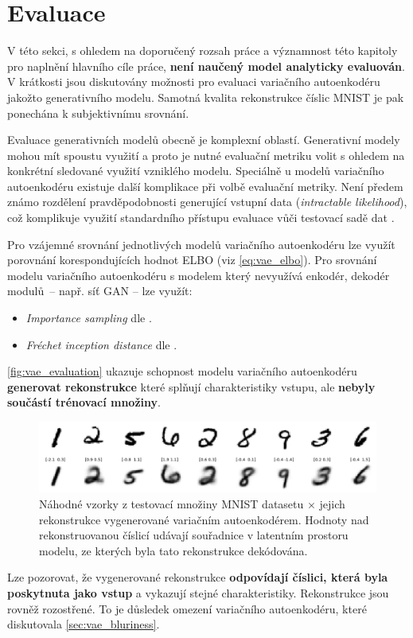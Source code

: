 \section{Evaluace}
V této sekci, s ohledem na doporučený rozsah práce a významnost této kapitoly pro naplnění hlavního cíle práce, \textbf{není naučený model analyticky evaluován}.
V krátkosti jsou diskutovány možnosti pro evaluaci variačního autoenkodéru jakožto generativního modelu.
Samotná kvalita rekonstrukce číslic MNIST je pak ponechána k subjektivnímu srovnání.

Evaluace generativních modelů obecně je komplexní oblastí.
Generativní modely mohou mít spoustu využití a proto je nutné evaluační metriku volit s ohledem na konkrétní sledované využití vzniklého modelu.
Speciálně u modelů variačního autoenkodéru existuje další komplikace při volbě evaluační metriky. Není předem známo rozdělení pravděpodobnosti generující vstupní data (\emph{intractable likelihood}), což komplikuje využití standardního přístupu evaluace vůči testovací sadě dat \cite{Goodfellow2016}.

Pro vzájemné srovnání jednotlivých modelů variačního autoenkodéru lze využít porovnání korespondujících hodnot ELBO (viz \autoref{eq:vae_elbo}).
Pro srovnání modelu variačního autoenkodéru s modelem který nevyužívá enkodér, dekodér modulů – např. síť GAN \cite{Goodfellow2014} – lze využít:

\begin{itemize}
    \item \emph{Importance sampling} dle \textcite{Bartler2019}.
    \item \emph{Fréchet inception distance} dle \textcite{Asperti2020}.
\end{itemize}

\autoref{fig:vae_evaluation} ukazuje schopnost modelu variačního autoenkodéru \textbf{generovat rekonstrukce} které splňují charakteristiky vstupu, ale \textbf{nebyly součástí trénovací množiny}.

\begin{figure}[H]
    \centering
    \includegraphics[width=\textwidth]{figures/vae_model_reconstructions.png}
    \caption{Náhodné vzorky z testovací množiny MNIST datasetu $\times$ jejich rekonstrukce vygenerované variačním autoenkodérem. Hodnoty nad rekonstruovanou číslicí udávají souřadnice v latentním prostoru modelu, ze kterých byla tato rekonstrukce dekódována.}
    \label{fig:vae_evaluation}
\end{figure}

Lze pozorovat, že vygenerované rekonstrukce \textbf{odpovídají číslici, která byla poskytnuta jako vstup} a vykazují stejné charakteristiky.
Rekonstrukce jsou rovněž rozostřené. To je důsledek omezení variačního autoenkodéru, které diskutovala \autoref{sec:vae_bluriness}. 

